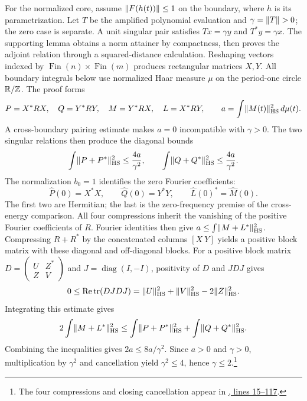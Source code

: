 For the normalized core, assume $\lVert F(h(t))\rVert\leq1$ on the boundary,
where $h$ is its parametrization. Let $T$ be the amplified polynomial
evaluation and $\gamma=\lVert T\rVert>0$;
the zero case is separate. A unit singular pair satisfies
$Tx=\gamma y$ and $T^*y=\gamma x$. The supporting lemma obtains a norm
attainer by compactness, then proves the adjoint relation through a
squared-distance calculation. Reshaping vectors indexed by
$\operatorname{Fin}(n)\times\operatorname{Fin}(m)$ produces rectangular
matrices $X,Y$. All boundary integrals below use normalized Haar measure
$\mu$ on the period-one circle $\mathbb R/\mathbb{Z}$.
The proof forms
\[
 P=X^*RX,\quad Q=Y^*RY,\quad M=Y^*RX,\quad L=X^*RY,
 \qquad a=\int\lVert M(t)\rVert_{\mathrm{HS}}^2\,d\mu(t).
\]
A cross-boundary pairing estimate makes $a=0$ incompatible with $\gamma>0$. The two singular relations then produce the diagonal bounds
\[
 \int\lVert P+P^*\rVert_{\mathrm{HS}}^2\leq\frac{4a}{\gamma^2},
 \qquad
 \int\lVert Q+Q^*\rVert_{\mathrm{HS}}^2\leq\frac{4a}{\gamma^2}.
\]
The normalization $b_0=1$ identifies the zero Fourier coefficients:
\[
 \widehat P(0)=X^*X,\qquad \widehat Q(0)=Y^*Y,\qquad
 \widehat L(0)^*=\widehat M(0).
\]
The first two are Hermitian; the last is the zero-frequency premise of
the cross-energy comparison. All four compressions inherit the vanishing
of the positive Fourier coefficients of $R$.
Fourier identities then give $a\leq\int\lVert M+L^*\rVert_{\mathrm{HS}}^2$.
Compressing $R+R^*$ by the concatenated columns $[X\ Y]$ yields a positive
block matrix with these diagonal and off-diagonal blocks. For a positive
block matrix $D=\left(\begin{smallmatrix}U&Z^*\\Z&V\end{smallmatrix}\right)$
and $J=\operatorname{diag}(I,-I)$, positivity of $D$ and $JDJ$ gives
\[
 0\leq\operatorname{Re}\operatorname{tr}(DJDJ)
   =\lVert U\rVert_{\mathrm{HS}}^2+\lVert V\rVert_{\mathrm{HS}}^2
     -2\lVert Z\rVert_{\mathrm{HS}}^2.
\]
Integrating this estimate gives
\[
 2\int\lVert M+L^*\rVert_{\mathrm{HS}}^2
 \leq\int\lVert P+P^*\rVert_{\mathrm{HS}}^2
       +\int\lVert Q+Q^*\rVert_{\mathrm{HS}}^2.
\]
Combining the inequalities gives $2a\leq8a/\gamma^2$. Since $a>0$ and $\gamma>0$, multiplication by $\gamma^2$ and cancellation yield $\gamma^2\leq4$, hence $\gamma\leq2$.\footnote{The four compressions and closing cancellation
appear in
\href{https://github.com/openai/math/blob/fd4aeeb2ee4fc729c18d98444fed42fd0529eeeb/lean/OAI/Analysis/DirectCrouzeix/DomainCore.lean\#L15-L117}{, lines 15--117}.}


